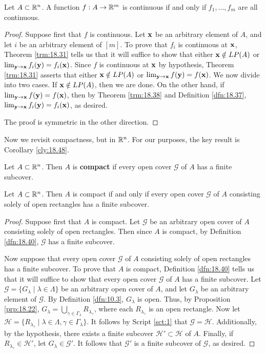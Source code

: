 \documentclass[../main.tex]{subfiles}
\begin{document}
\begin{corollary}\label{cly:18.39}
    Let $A\subset\mathbb{R}^n$. A function $f:A\to\mathbb{R}^m$ is continuous if and only if $f_1,\dots,f_m$ are all continuous.
    \begin{proof}
        Suppose first that $f$ is continuous. Let $\mathbf{x}$ be an arbitrary element of $A$, and let $i$ be an arbitrary element of $[m]$. To prove that $f_i$ is continuous at $\mathbf{x}$, Theorem \ref{trm:18.31} tells us that it will suffice to show that either $\mathbf{x}\notin LP(A)$ or $\lim_{\mathbf{y}\to\mathbf{x}}f_i(\mathbf{y})=f_i(\mathbf{x})$. Since $f$ is continuous at $\mathbf{x}$ by hypothesis, Theorem \ref{trm:18.31} asserts that either $\mathbf{x}\notin LP(A)$ or $\lim_{\mathbf{y}\to\mathbf{x}}f(\mathbf{y})=f(\mathbf{x})$. We now divide into two cases. If $\mathbf{x}\notin LP(A)$, then we are done. On the other hand, if $\lim_{\mathbf{y}\to\mathbf{x}}f(\mathbf{y})=f(\mathbf{x})$, then by Theorem \ref{trm:18.38} and Definition \ref{dfn:18.37}, $\lim_{\mathbf{y}\to\mathbf{x}}f_i(\mathbf{y})=f_i(\mathbf{x})$, as desired.\par
        The proof is symmetric in the other direction.
    \end{proof}
\end{corollary}

Now we revisit compactness, but in $\mathbb{R}^n$. For our purposes, the key result is Corollary \ref{cly:18.48}.

\begin{definition}\label{dfn:18.40}
    Let $A\subset\mathbb{R}^n$. Then $A$ is \textbf{compact} if every open cover $\mathcal{G}$ of $A$ has a finite subcover.
\end{definition}

\begin{proposition}\label{prp:18.41}
    Let $A\subset\mathbb{R}^n$. Then $A$ is compact if and only if every open cover $\mathcal{G}$ of $A$ consisting solely of open rectangles has a finite subcover.
    \begin{proof}
        Suppose first that $A$ is compact. Let $\mathcal{G}$ be an arbitrary open cover of $A$ consisting solely of open rectangles. Then since $A$ is compact, by Definition \ref{dfn:18.40}, $\mathcal{G}$ has a finite subcover.\par
        Now suppose that every open cover $\mathcal{G}$ of $A$ consisting solely of open rectangles has a finite subcover. To prove that $A$ is compact, Definition \ref{dfn:18.40} tells us that it will suffice to show that every open cover $\mathcal{G}$ of $A$ has a finite subcover. Let $\mathcal{G}=\{G_\lambda\mid\lambda\in\Lambda\}$ be an arbitrary open cover of $A$, and let $G_\lambda$ be an arbitrary element of $\mathcal{G}$. By Definition \ref{dfn:10.3}, $G_\lambda$ is open. Thus, by Proposition \ref{prp:18.22}, $G_\lambda=\bigcup_{\gamma\in\Gamma_\lambda}R_{\lambda_\gamma}$, where each $R_{\lambda_\gamma}$ is an open rectangle. Now let $\mathcal{H}=\{R_{\lambda_\gamma}\mid\lambda\in\Lambda,\gamma\in\Gamma_\lambda\}$. It follows by Script \ref{sct:1} that $\mathcal{G}=\mathcal{H}$. Additionally, by the hypothesis, there exists a finite subcover $\mathcal{H}'\subset\mathcal{H}$ of $A$. Finally, if $R_{\lambda_\gamma}\in\mathcal{H}'$, let $G_\lambda\in\mathcal{G}'$. It follows that $\mathcal{G}'$ is a finite subcover of $\mathcal{G}$, as desired.
    \end{proof}
\end{proposition}
\end{document}
